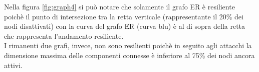 \documentclass{article}
\begin{document}
Nella figura \ref{fig:graph4} si può notare che solamente il grafo ER è resiliente poichè il punto di intersezione tra la retta verticale (rappresentante il 20\% dei nodi disattivati) con la curva del grafo ER (curva blu) è al di sopra della retta che rappresenta l'andamento resiliente.
\\I rimanenti due grafi, invece, non sono resilienti poichè in seguito agli attacchi la dimensione massima delle componenti connesse è inferiore al 75\% dei nodi ancora attivi.

\FloatBarrier
\end{document}
